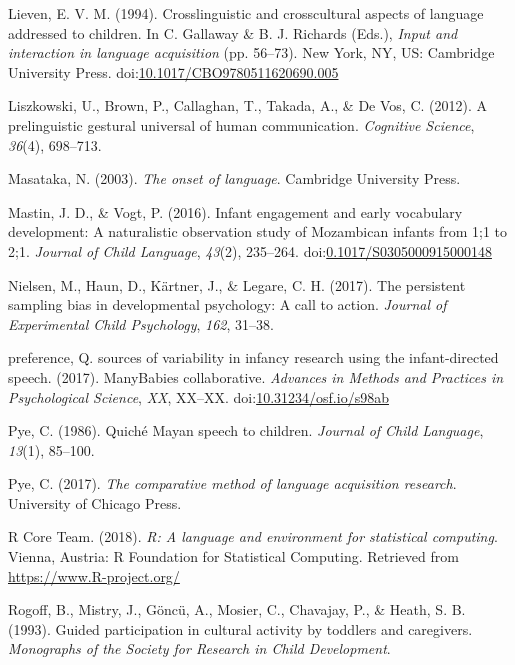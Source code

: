 \documentclass[floatsintext,man]{apa6}
\theoremstyle{definition}
\theoremstyle{definition}
\theoremstyle{definition}
\theoremstyle{remark}
\begin{document}
\hypertarget{ref-lieven1994crosslinguistic}{}
Lieven, E. V. M. (1994). Crosslinguistic and crosscultural aspects of
language addressed to children. In C. Gallaway \& B. J. Richards (Eds.),
\emph{Input and interaction in language acquisition} (pp. 56--73). New
York, NY, US: Cambridge University Press.
doi:\href{https://doi.org/10.1017/CBO9780511620690.005}{10.1017/CBO9780511620690.005}

\hypertarget{ref-liszkowski2012prelinguistic}{}
Liszkowski, U., Brown, P., Callaghan, T., Takada, A., \& De Vos, C.
(2012). A prelinguistic gestural universal of human communication.
\emph{Cognitive Science}, \emph{36}(4), 698--713.

\hypertarget{ref-masataka2003onset}{}
Masataka, N. (2003). \emph{The onset of language}. Cambridge University
Press.

\hypertarget{ref-mastin2016infant}{}
Mastin, J. D., \& Vogt, P. (2016). Infant engagement and early
vocabulary development: A naturalistic observation study of Mozambican
infants from 1;1 to 2;1. \emph{Journal of Child Language}, \emph{43}(2),
235--264.
doi:\href{https://doi.org/0.1017/S0305000915000148}{0.1017/S0305000915000148}

\hypertarget{ref-nielsen2017persistent}{}
Nielsen, M., Haun, D., Kärtner, J., \& Legare, C. H. (2017). The
persistent sampling bias in developmental psychology: A call to action.
\emph{Journal of Experimental Child Psychology}, \emph{162}, 31--38.

\hypertarget{ref-manybabies2017}{}
preference, Q. sources of variability in infancy research using the
infant-directed speech. (2017). ManyBabies collaborative. \emph{Advances
in Methods and Practices in Psychological Science}, \emph{XX}, XX--XX.
doi:\href{https://doi.org/10.31234/osf.io/s98ab}{10.31234/osf.io/s98ab}

\hypertarget{ref-pye1986quiche}{}
Pye, C. (1986). Quiché Mayan speech to children. \emph{Journal of Child
Language}, \emph{13}(1), 85--100.

\hypertarget{ref-pye2017comparative}{}
Pye, C. (2017). \emph{The comparative method of language acquisition
research}. University of Chicago Press.

\hypertarget{ref-R-base}{}
R Core Team. (2018). \emph{R: A language and environment for statistical
computing}. Vienna, Austria: R Foundation for Statistical Computing.
Retrieved from \url{https://www.R-project.org/}

\hypertarget{ref-rogoff1993guided}{}
Rogoff, B., Mistry, J., Göncü, A., Mosier, C., Chavajay, P., \& Heath,
S. B. (1993). Guided participation in cultural activity by toddlers and
caregivers. \emph{Monographs of the Society for Research in Child
Development}.
\end{document}
